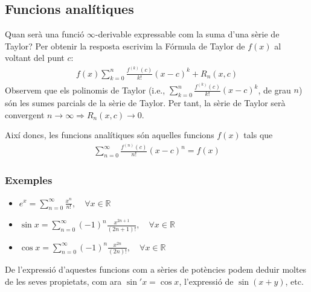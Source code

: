 \subsection{Funcions analítiques}
Quan serà una funció $\infty$-derivable expressable com la suma d'una sèrie de Taylor? Per obtenir la resposta escrivim la Fórmula de Taylor de $f(x)$ al voltant del punt $c$:
\begin{align}
    f(x) \sum\limits_{k=0}^{n} \frac{f^{(k)}(c)}{k!} (x-c)^{k} + R_{n}(x,c)
\end{align}
Observem que els polinomis de Taylor (i.e., $\sum_{k=0}^{n} \frac{f^{(k)}(c)}{k!} (x-c)^{k}$, de grau $n$) són les sumes parcials de la sèrie de Taylor. Per tant, la sèrie de Taylor serà convergent $n \to \infty \Rightarrow R_{n} (x,c) \to 0$.

Així doncs, les funcions analítiques són aquelles funcions $f(x)$ tals que
\begin{align}
    \sum\limits_{n=0}^{\infty} \frac{f^{(n)}(c)}{n!} (x-c)^{n} = f(x)
\end{align}

\subsubsection*{Exemples}
\begin{itemize}
    \item $\displaystyle e^{x} = \sum\limits_{n=0}^{\infty} \frac{x^{n}}{n!}, \quad \forall x \in \mathbb{R}$
    \item $\displaystyle \sin x = \sum\limits_{n=0}^{\infty} (-1)^{n} \frac{x^{2n+1}}{(2n+1)!}, \quad \forall x \in \mathbb{R}$
    \item $\displaystyle \cos x = \sum\limits_{n=0}^{\infty} (-1)^{n} \frac{x^{2n}}{(2n)!}, \quad \forall x \in \mathbb{R}$
\end{itemize}
De l'expressió d'aquestes funcions com a sèries de potències podem deduir moltes de les seves propietats, com ara $\sin ' x = \cos x$, l'expressió de $\sin (x+y)$, etc.

